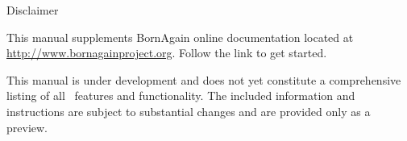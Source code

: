 \newpage

{\Huge 
\vspace*{0.5cm}
\noindent
Disclaimer
} \newline
\vspace*{0.25cm}

\noindent
{\large
This manual supplements BornAgain online documentation located at \url{http://www.bornagainproject.org}.
Follow the link to get started.
\vspace*{4mm}

\noindent
This manual is under development and does not yet constitute a comprehensive listing of
all \BornAgain\ features and functionality. 
The included information and instructions are subject to substantial changes and
are provided only as a preview.
}
